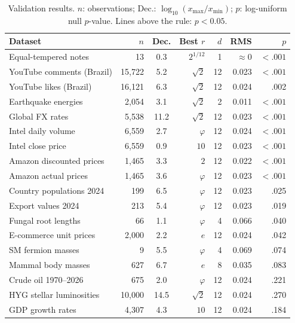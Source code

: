 \documentclass[10pt,a4paper]{article}
\begin{document}
\begin{table}[htbp]
\centering
\small
\caption{Validation results. $n$: observations;
Dec.: $\log_{10}(x_{\max}/x_{\min})$;
$p$: log-uniform null $p$-value.
Lines above the rule: $p < 0.05$.}
\label{tab:validation}
\begin{tabular}{lrcrrrr}
\toprule
Dataset & $n$ & Dec. & Best $r$ & $d$ & RMS & $p$ \\
\midrule
Equal-tempered notes     &     13 &  0.3 & $2^{1/12}$ &  1 & $\approx 0$ & $<.001$ \\
YouTube comments (Brazil)& 15,722 &  5.2 & $\sqrt{2}$ & 12 & 0.023 & $<.001$ \\
YouTube likes (Brazil)   & 16,121 &  6.3 & $\sqrt{2}$ & 12 & 0.024 & .002 \\
Earthquake energies      &  2,054 &  3.1 & $\sqrt{2}$ &  2 & 0.011 & $<.001$ \\
Global FX rates          &  5,538 & 11.2 & $\sqrt{2}$ & 12 & 0.023 & $<.001$ \\
Intel daily volume       &  6,559 &  2.7 & $\varphi$  & 12 & 0.024 & $<.001$ \\
Intel close price        &  6,559 &  0.9 & $10$       & 12 & 0.023 & $<.001$ \\
Amazon discounted prices &  1,465 &  3.3 & $2$        & 12 & 0.022 & $<.001$ \\
Amazon actual prices     &  1,465 &  3.6 & $\varphi$  & 12 & 0.023 & $<.001$ \\
Country populations 2024 &    199 &  6.5 & $\varphi$  & 12 & 0.023 & .025 \\
Export values 2024       &    213 &  5.4 & $\varphi$  & 12 & 0.023 & .019 \\
Fungal root lengths      &     66 &  1.1 & $\varphi$  &  4 & 0.066 & .040 \\
E-commerce unit prices   &  2,000 &  2.2 & $e$        & 12 & 0.024 & .042 \\
SM fermion masses        &      9 &  5.5 & $\varphi$  &  4 & 0.069 & .074 \\
Mammal body masses       &    627 &  6.7 & $e$        &  8 & 0.035 & .083 \\
\midrule
Crude oil 1970--2026     &    675 &  2.0 & $\varphi$  & 12 & 0.024 & .221 \\
HYG stellar luminosities & 10,000 & 14.5 & $\sqrt{2}$ & 12 & 0.024 & .270 \\
GDP growth rates         &  4,307 &  4.3 & $10$       & 12 & 0.024 & .184 \\
\bottomrule
\end{tabular}
\end{table}
\end{document}
